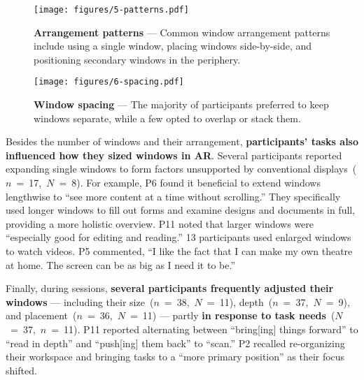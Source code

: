 \begin{figure*}
    \centering
    \texttt{[image: figures/5-patterns.pdf]}
    \caption{\textbf{Arrangement patterns} --- Common window arrangement patterns include using a single window, placing windows side-by-side, and positioning secondary windows in the periphery.}
    \label{fig:patterns}
\end{figure*}

\begin{figure*}
    \centering
    \texttt{[image: figures/6-spacing.pdf]}
    \caption{\textbf{Window spacing} --- The majority of participants preferred to keep windows separate, while a few opted to overlap or stack them.}
    \label{fig:spacing}
\end{figure*}

Besides the number of windows and their arrangement, 
\textbf{participants' tasks also influenced how they sized windows in AR}.
Several participants reported expanding single windows to form factors unsupported by conventional displays~($n$~=~17,~$N$~=~8).
For example, 
P6 found it beneficial to extend windows lengthwise to ``see more content at a time without scrolling.''
They specifically used longer windows to fill out forms and examine designs and documents in full, providing a more holistic overview.
P11 noted that larger windows were ``especially good for editing and reading.'' 
13 participants 
used enlarged windows to watch videos. 
P5 commented, ``I like the fact that I can make my own theatre at home. The screen can be as big as I need it to be.''

Finally, during sessions, \textbf{several participants frequently adjusted their windows} --- including their size~($n$~=~38,~$N$~=~11), 
depth~($n$~=~37,~$N$~=~9), 
and placement~($n$~=~36,~$N$~=~11) --- 
partly \textbf{in response to task needs}~($N$~=~37,~$n$~=~11).
P11 reported alternating between ``bring[ing] things forward'' to ``read in depth'' and ``push[ing] them back'' to ``scan.''
P2 recalled re-organizing their workspace and bringing tasks to a ``more primary position'' as their focus shifted.


